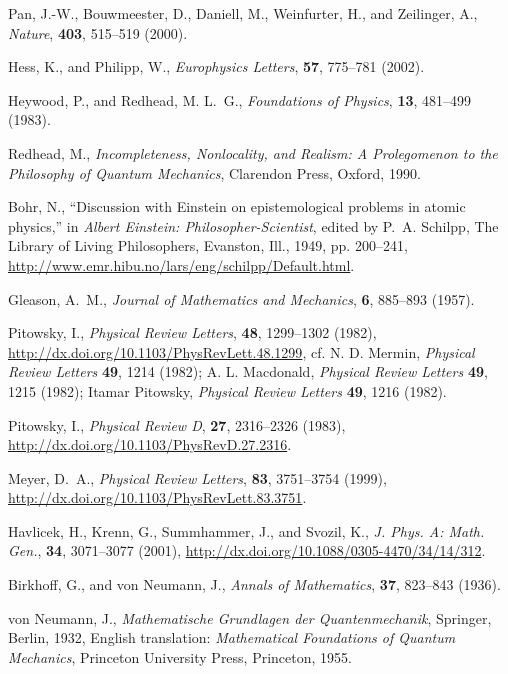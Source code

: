 \documentclass{aipproc}
\begin{document}
\begin{thebibliography}{10}
Pan, J.-W., Bouwmeester, D., Daniell, M., Weinfurter, H., and Zeilinger, A.,
  \emph{Nature}, \textbf{403}, 515--519 (2000).

Hess, K., and Philipp, W., \emph{Europhysics Letters}, \textbf{57}, 775--781
  (2002).

Heywood, P., and Redhead, M. L.~G., \emph{Foundations of Physics}, \textbf{13},
  481--499 (1983).

Redhead, M., \emph{Incompleteness, Nonlocality, and Realism: A Prolegomenon to
  the Philosophy of Quantum Mechanics}, Clarendon Press, Oxford, 1990.

Bohr, N., \enquote{Discussion with {E}instein on epistemological problems in
  atomic physics,} in \emph{{A}lbert {E}instein: Philosopher-Scientist}, edited
  by P.~A. Schilpp, The Library of Living Philosophers, Evanston, Ill., 1949,
  pp. 200--241,
  \urlprefix\url{http://www.emr.hibu.no/lars/eng/schilpp/Default.html}.

Gleason, A.~M., \emph{Journal of Mathematics and Mechanics}, \textbf{6},
  885--893 (1957).

Pitowsky, I., \emph{Physical Review Letters}, \textbf{48}, 1299--1302 (1982),
  \urlprefix\url{http://dx.doi.org/10.1103/PhysRevLett.48.1299}, cf. N. D.
  Mermin, {\sl Physical Review Letters} {\bf 49}, 1214 (1982); A. L. Macdonald,
  {\sl Physical Review Letters} {\bf 49}, 1215 (1982); Itamar Pitowsky, {\sl
  Physical Review Letters} {\bf 49}, 1216 (1982).

Pitowsky, I., \emph{Physical Review D}, \textbf{27}, 2316--2326 (1983),
  \urlprefix\url{http://dx.doi.org/10.1103/PhysRevD.27.2316}.

Meyer, D.~A., \emph{Physical Review Letters}, \textbf{83}, 3751--3754 (1999),
  \urlprefix\url{http://dx.doi.org/10.1103/PhysRevLett.83.3751}.

Havlicek, H., Krenn, G., Summhammer, J., and Svozil, K., \emph{J. Phys. A:
  Math. Gen.}, \textbf{34}, 3071--3077 (2001),
  \urlprefix\url{http://dx.doi.org/10.1088/0305-4470/34/14/312}.

Birkhoff, G., and von Neumann, J., \emph{Annals of Mathematics}, \textbf{37},
  823--843 (1936).

von Neumann, J., \emph{Mathematische Grundlagen der Quantenmechanik}, Springer,
  Berlin, 1932, {E}nglish translation: {\sl Mathematical Foundations of Quantum
  Mechanics}, Princeton University Press, Princeton, 1955.


\end{thebibliography}
\end{document}
